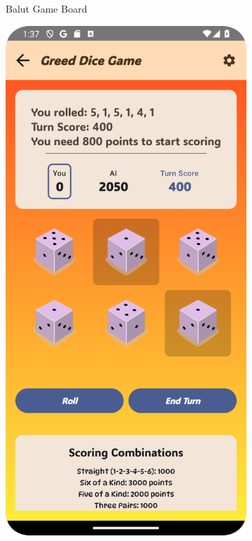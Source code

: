 \begin{figure}[h]
\begin{subfigure}[b]{0.27\textwidth}
        \caption{Balut Game Board}
    \end{subfigure}
    \hfill
    \begin{subfigure}[b]{0.27\textwidth}
        \includegraphics[width=\textwidth]{img/greed board.png}

\end{subfigure}
\end{figure}
